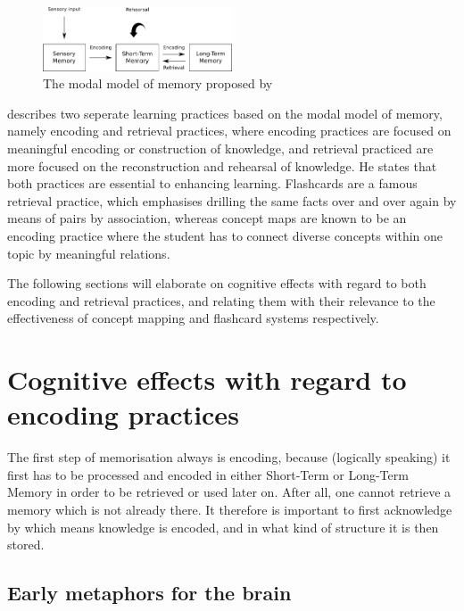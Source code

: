 \begin{figure}
    \centering
    \includegraphics[width=0.5\textwidth]{img/modalmemory.png}
    \caption{The modal model of memory proposed by \protect{}}
    \label{fig:modalmemory}
\end{figure}

 describes two seperate learning practices based on the modal model of memory, namely encoding and retrieval practices, where encoding practices are focused on meaningful encoding or construction of knowledge, and retrieval practiced are more focused on the reconstruction and rehearsal of knowledge. He states that both practices are essential to enhancing learning. Flashcards are a famous retrieval practice, which emphasises drilling the same facts over and over again by means of pairs by association, whereas concept maps are known to be an encoding practice where the student has to connect diverse concepts within one topic by meaningful relations.

The following sections will elaborate on cognitive effects with regard to both encoding and retrieval practices, and relating them with their relevance to the effectiveness of concept mapping and flashcard systems respectively.

\section{Cognitive effects with regard to encoding practices}

The first step of memorisation always is encoding, because (logically speaking) it first has to be processed and encoded in either Short-Term or Long-Term Memory in order to be retrieved or used later on. After all, one cannot retrieve a memory which is not already there. It therefore is important to first acknowledge by which means knowledge is encoded, and in what kind of structure it is then stored.

\subsection{Early metaphors for the brain}

